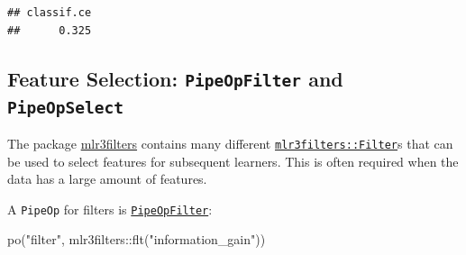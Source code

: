 \documentclass[
]{scrbook}
\newenvironment{Shaded}{\begin{snugshade}}{\end{snugshade}}
\newcommand{\DecValTok}[1]{\textcolor[rgb]{0.00,0.00,0.81}{#1}}
\newcommand{\FunctionTok}[1]{\textcolor[rgb]{0.00,0.00,0.00}{#1}}
\newcommand{\NormalTok}[1]{#1}
\newcommand{\OtherTok}[1]{\textcolor[rgb]{0.56,0.35,0.01}{#1}}
\newcommand{\SpecialCharTok}[1]{\textcolor[rgb]{0.00,0.00,0.00}{#1}}
\newcommand{\StringTok}[1]{\textcolor[rgb]{0.31,0.60,0.02}{#1}}
\renewenvironment{Shaded} {\begin{snugshade}\small} {\end{snugshade}}
\begin{document}
\begin{Shaded}
\end{Shaded}

\begin{verbatim}
## classif.ce 
##      0.325
\end{verbatim}

\hypertarget{feature-selection-pipeopfilter-and-pipeopselect}{%
\subsection{\texorpdfstring{Feature Selection: \texttt{PipeOpFilter} and \texttt{PipeOpSelect}}{Feature Selection: PipeOpFilter and PipeOpSelect}}\label{feature-selection-pipeopfilter-and-pipeopselect}}

The package \href{https://mlr3filters.mlr-org.com}{mlr3filters} contains many different \href{https://mlr3filters.mlr-org.com/reference/Filter.html}{\texttt{mlr3filters::Filter}}s that can be used to select features for subsequent learners.
This is often required when the data has a large amount of features.

A \texttt{PipeOp} for filters is \href{https://mlr3pipelines.mlr-org.com/reference/mlr_pipeops_filter.html}{\texttt{PipeOpFilter}}:

\begin{Shaded}
\begin{Highlighting}[]
\FunctionTok{po}\NormalTok{(}\StringTok{"filter"}\NormalTok{, mlr3filters}\SpecialCharTok{::}\FunctionTok{flt}\NormalTok{(}\StringTok{"information\_gain"}\NormalTok{))}
\end{Highlighting}
\end{Shaded}
\end{document}
